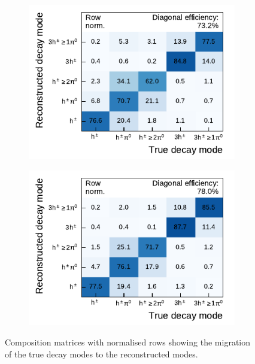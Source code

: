 \begin{figure}[htb]
  \begin{subfigure}[t]{0.48\textwidth}
    \centering
    \includegraphics{./figures/decay_mode_classification/comp_mat_pantau.pdf}
  \end{subfigure}\hfill
  \begin{subfigure}[t]{0.48\textwidth}
    \centering
    \includegraphics{./figures/decay_mode_classification/comp_mat_baseline_ptcut_1_5.pdf}
  \end{subfigure}
  \caption{Composition matrices with normalised rows showing the migration of
    the true decay modes to the reconstructed modes.}
  \label{fig:migmat}
\end{figure}



